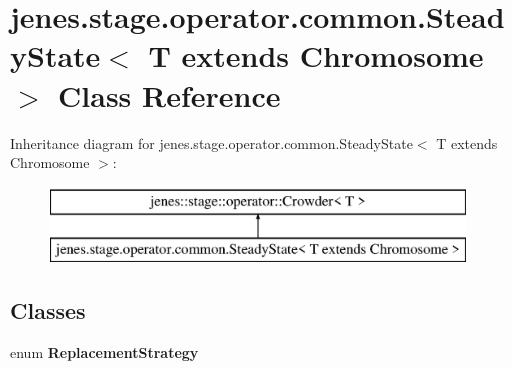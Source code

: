 \hypertarget{classjenes_1_1stage_1_1operator_1_1common_1_1_steady_state_3_01_t_01extends_01_chromosome_01_4}{\section{jenes.\-stage.\-operator.\-common.\-Steady\-State$<$ T extends Chromosome $>$ Class Reference}
\label{classjenes_1_1stage_1_1operator_1_1common_1_1_steady_state_3_01_t_01extends_01_chromosome_01_4}
}
Inheritance diagram for jenes.\-stage.\-operator.\-common.\-Steady\-State$<$ T extends Chromosome $>$\-:\begin{figure}[H]
\begin{center}
\leavevmode
\includegraphics[height=2.000000cm]{classjenes_1_1stage_1_1operator_1_1common_1_1_steady_state_3_01_t_01extends_01_chromosome_01_4}
\end{center}
\end{figure}
\subsection*{Classes}
\begin{DoxyCompactItemize}
\item 
enum {\bfseries Replacement\-Strategy}
\end{DoxyCompactItemize}
